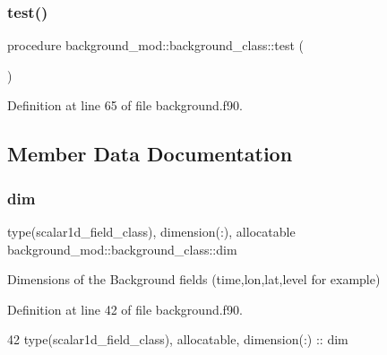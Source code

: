 \subsubsection{\texorpdfstring{test()}{test()}}
{\footnotesize\ttfamily procedure background\+\_\+mod\+::background\+\_\+class\+::test (\begin{DoxyParamCaption}{ }\end{DoxyParamCaption})\hspace{0.3cm}{\ttfamily [private]}}



Definition at line 65 of file background.\+f90.



\subsection{Member Data Documentation}
\mbox{\label{structbackground__mod_1_1background__class_a086f319ce4f039190699578d69927013}} 
\subsubsection{\texorpdfstring{dim}{dim}}
{\footnotesize\ttfamily type(scalar1d\+\_\+field\+\_\+class), dimension(\+:), allocatable background\+\_\+mod\+::background\+\_\+class\+::dim\hspace{0.3cm}{\ttfamily [private]}}



Dimensions of the Background fields (time,lon,lat,level for example) 



Definition at line 42 of file background.\+f90.


\begin{DoxyCode}
42         \textcolor{keywordtype}{type}(scalar1d\_field\_class), \textcolor{keywordtype}{allocatable}, \textcolor{keywordtype}{dimension(:)} :: dim
\end{DoxyCode}
\mbox{\label{structbackground__mod_1_1background__class_acaaef54168dbee2731a99d0852844844}} 
